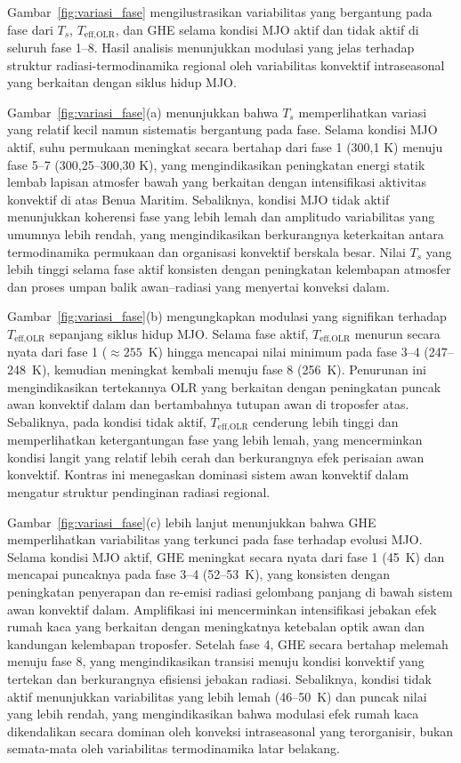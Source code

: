 \documentclass[12pt,a4paper]{report}
\begin{document}
Gambar~\ref{fig:variasi_fase} mengilustrasikan variabilitas yang bergantung pada fase dari $T_s$, $T_{\text{eff,OLR}}$, dan GHE selama kondisi MJO aktif dan tidak aktif di seluruh fase 1--8. Hasil analisis menunjukkan modulasi yang jelas terhadap struktur radiasi-termodinamika regional oleh variabilitas konvektif intraseasonal yang berkaitan dengan siklus hidup MJO.

 
Gambar~\ref{fig:variasi_fase}(a) menunjukkan bahwa $T_s$ memperlihatkan variasi yang relatif kecil namun sistematis bergantung pada fase. Selama kondisi MJO aktif, suhu permukaan meningkat secara bertahap dari fase 1 (300,1 K) menuju fase 5--7 (300,25--300,30 K), yang mengindikasikan peningkatan energi statik lembab lapisan atmosfer bawah yang berkaitan dengan intensifikasi aktivitas konvektif di atas Benua Maritim. Sebaliknya, kondisi MJO tidak aktif menunjukkan koherensi fase yang lebih lemah dan amplitudo variabilitas yang umumnya lebih rendah, yang mengindikasikan berkurangnya keterkaitan antara termodinamika permukaan dan organisasi konvektif berskala besar. Nilai $T_s$ yang lebih tinggi selama fase aktif konsisten dengan peningkatan kelembapan atmosfer dan proses umpan balik awan--radiasi yang menyertai konveksi dalam.
 
Gambar~\ref{fig:variasi_fase}(b) mengungkapkan modulasi yang signifikan terhadap $T_{\text{eff,OLR}}$ sepanjang siklus hidup MJO. Selama fase aktif, $T_{\text{eff,OLR}}$ menurun secara nyata dari fase 1 ($\approx 255$~K) hingga mencapai nilai minimum pada fase 3--4 (247--248~K), kemudian meningkat kembali menuju fase 8 (256~K). Penurunan ini mengindikasikan tertekannya OLR yang berkaitan dengan peningkatan puncak awan konvektif dalam dan bertambahnya tutupan awan di troposfer atas. Sebaliknya, pada kondisi tidak aktif, $T_{\text{eff,OLR}}$ cenderung lebih tinggi dan memperlihatkan ketergantungan fase yang lebih lemah, yang mencerminkan kondisi langit yang relatif lebih cerah dan berkurangnya efek perisaian awan konvektif. Kontras ini menegaskan dominasi sistem awan konvektif dalam mengatur struktur pendinginan radiasi regional.
 
Gambar~\ref{fig:variasi_fase}(c) lebih lanjut menunjukkan bahwa GHE memperlihatkan variabilitas yang terkunci pada fase terhadap evolusi MJO. Selama kondisi MJO aktif, GHE meningkat secara nyata dari fase 1 (45~K) dan mencapai puncaknya pada fase 3--4 (52--53~K), yang konsisten dengan peningkatan penyerapan dan re-emisi radiasi gelombang panjang di bawah sistem awan konvektif dalam. Amplifikasi ini mencerminkan intensifikasi jebakan efek rumah kaca yang berkaitan dengan meningkatnya ketebalan optik awan dan kandungan kelembapan troposfer. Setelah fase 4, GHE secara bertahap melemah menuju fase 8, yang mengindikasikan transisi menuju kondisi konvektif yang tertekan dan berkurangnya efisiensi jebakan radiasi. Sebaliknya, kondisi tidak aktif menunjukkan variabilitas yang lebih lemah (46--50~K) dan puncak nilai yang lebih rendah, yang mengindikasikan bahwa modulasi efek rumah kaca dikendalikan secara dominan oleh konveksi intraseasonal yang terorganisir, bukan semata-mata oleh variabilitas termodinamika latar belakang.
 
\end{document}
